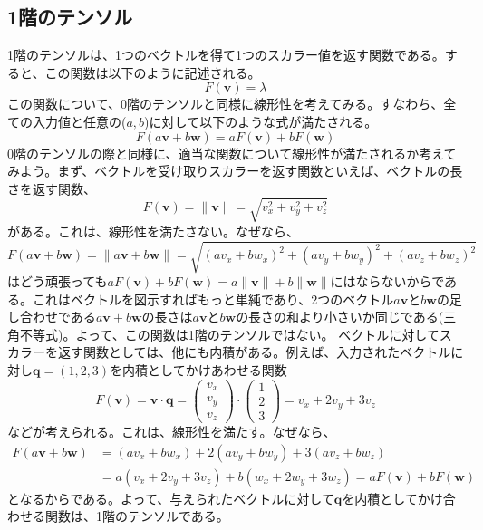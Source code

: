 \subsection{1階のテンソル}
1階のテンソルは、1つのベクトルを得て1つのスカラー値を返す関数である。すると、この関数は以下のように記述される。
\begin{equation}
	F(\boldsymbol{v})=\lambda
\end{equation}
この関数について、0階のテンソルと同様に線形性を考えてみる。すなわち、全ての入力値と任意の(\(a,b\))に対して以下のような式が満たされる。
\begin{equation}
	F(a\boldsymbol{v}+b\boldsymbol{w})=aF(\boldsymbol{v})+bF(\boldsymbol{w})
\end{equation}
0階のテンソルの際と同様に、適当な関数について線形性が満たされるか考えてみよう。まず、ベクトルを受け取りスカラーを返す関数といえば、ベクトルの長さを返す関数、
\begin{equation}
	F(\boldsymbol{v})=\|\boldsymbol{v}\|=\sqrt{v_x^2+v_y^2+v_z^2}
\end{equation}
がある。これは、線形性を満たさない。なぜなら、
\begin{equation}
	F(a\boldsymbol{v}+b\boldsymbol{w})=\|a\boldsymbol{v}+b\boldsymbol{w}\|=\sqrt{(av_x+bw_x)^2+(av_y+bw_y)^2+(av_z+bw_z)^2}
\end{equation}
はどう頑張っても\(aF(\boldsymbol{v})+bF(\boldsymbol{w})=a\|\boldsymbol{v}\|+b\|\boldsymbol{w}\|\)にはならないからである。これはベクトルを図示すればもっと単純であり、2つのベクトル\(a\boldsymbol{v}\)と\(b\boldsymbol{w}\)の足し合わせである\(a\boldsymbol{v}+b\boldsymbol{w}\)の長さは\(a\boldsymbol{v}\)と\(b\boldsymbol{w}\)の長さの和より小さいか同じである(三角不等式)。よって、この関数は1階のテンソルではない。
ベクトルに対してスカラーを返す関数としては、他にも内積がある。例えば、入力されたベクトルに対し\(\boldsymbol{q}=(1,2,3)\)を内積としてかけあわせる関数
\begin{equation}
	F(\boldsymbol{v})=\boldsymbol{v}\cdot \boldsymbol{q}=\begin{pmatrix} v_x \\v_y \\v_z \end{pmatrix}\cdot\begin{pmatrix} 1 \\2 \\3 \end{pmatrix}=v_x+2v_y+3v_z
\end{equation}
などが考えられる。これは、線形性を満たす。なぜなら、
\begin{equation}
	\begin{aligned}
		F(a\boldsymbol{v}+b\boldsymbol{w}) & =(av_x+bw_x)+2(av_y+bw_y)+3(av_z+bw_z)                                   \\
		                                   & =a(v_x+2v_y+3v_z)+b(w_x+2w_y+3w_z)=aF(\boldsymbol{v})+bF(\boldsymbol{w})
	\end{aligned}
\end{equation}
となるからである。よって、与えられたベクトルに対して\(\boldsymbol{q}\)を内積としてかけ合わせる関数は、1階のテンソルである。

